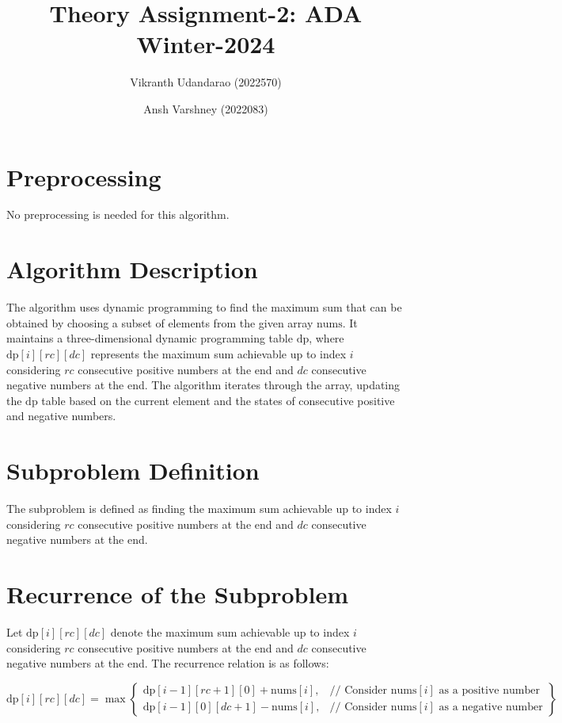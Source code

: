 \documentclass{article}
\title{Theory Assignment-2: ADA Winter-2024}
\author{Vikranth Udandarao (2022570) \and Ansh Varshney (2022083)}
\date{}
\begin{document}
\maketitle

\section{Preprocessing}
    No preprocessing is needed for this algorithm.

\section{Algorithm Description}
    The algorithm uses dynamic programming to find the maximum sum that can be obtained by choosing a subset of elements from the given array $\text{nums}$. It maintains a three-dimensional dynamic programming table $\text{dp}$, where $\text{dp}[i][rc][dc]$ represents the maximum sum achievable up to index $i$ considering $rc$ consecutive positive numbers at the end and $dc$ consecutive negative numbers at the end. The algorithm iterates through the array, updating the $\text{dp}$ table based on the current element and the states of consecutive positive and negative numbers.

\section{Subproblem Definition}
    The subproblem is defined as finding the maximum sum achievable up to index $i$ considering $rc$ consecutive positive numbers at the end and $dc$ consecutive negative numbers at the end.

\section{Recurrence of the Subproblem}
    Let $\text{dp}[i][rc][dc]$ denote the maximum sum achievable up to index $i$ considering $rc$ consecutive positive numbers at the end and $dc$ consecutive negative numbers at the end. The recurrence relation is as follows:

\[
\text{dp}[i][rc][dc] = \max\left\{
    \begin{array}{ll}
        \text{dp}[i-1][rc+1][0] + \text{nums}[i], & \text{// Consider } \text{nums}[i] \text{ as a positive number} \\
        \text{dp}[i-1][0][dc+1] - \text{nums}[i], & \text{// Consider } \text{nums}[i] \text{ as a negative number}
    \end{array}
\right\}
\]
\end{document}
